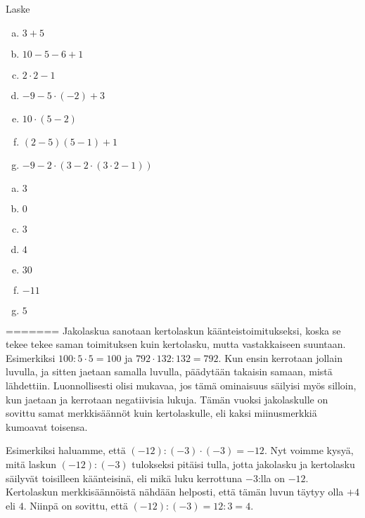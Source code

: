 \begin{tehtava}
Laske
\begin{enumerate}[a)]
\item $3+5$
\item $10-5-6+1$
\item $2 \cdot 2 - 1$
\item $-9 - 5 \cdot (-2) + 3$
\item $10 \cdot (5 - 2)$
\item $(2-5)(5 - 1) + 1$
\item $-9 - 2 \cdot ( 3 - 2 \cdot (3\cdot2 - 1))$
\end{enumerate}
\begin{vastaus}
\begin{enumerate}[a)]
\item $3$
\item $0$
\item $3$
\item $4$
\item $30$
\item $-11$
\item $5$
\end{enumerate}
\end{vastaus}
\end{tehtava}
=======
    Jakolaskua sanotaan kertolaskun käänteistoimitukseksi, koska se tekee tekee
    saman toimituksen kuin kertolasku, mutta vastakkaiseen suuntaan. Esimerkiksi
    $100:5\cdot 5=100$ ja $792\cdot 132:132=792$. Kun ensin kerrotaan jollain
    luvulla, ja sitten jaetaan samalla luvulla, päädytään takaisin samaan, mistä 
    lähdettiin. Luonnollisesti olisi mukavaa, jos tämä ominaisuus säilyisi myös
    silloin, kun jaetaan ja kerrotaan negatiivisia lukuja. Tämän vuoksi jakolaskulle
    on sovittu samat merkkisäännöt kuin kertolaskulle, eli kaksi miinusmerkkiä
    kumoavat toisensa.
    
    Esimerkiksi haluamme, että $(-12):(-3)\cdot (-3)=-12$. Nyt voimme kysyä, mitä
    laskun $(-12):(-3)$ tulokseksi pitäisi tulla, jotta jakolasku ja kertolasku
    säilyvät toisilleen käänteisinä, eli mikä luku kerrottuna $-3$:lla on $-12$.
    Kertolaskun merkkisäännöistä nähdään helposti, että tämän luvun täytyy olla
    $+4$ eli $4$. Niinpä on sovittu, että $(-12):(-3)=12:3=4$.
    
